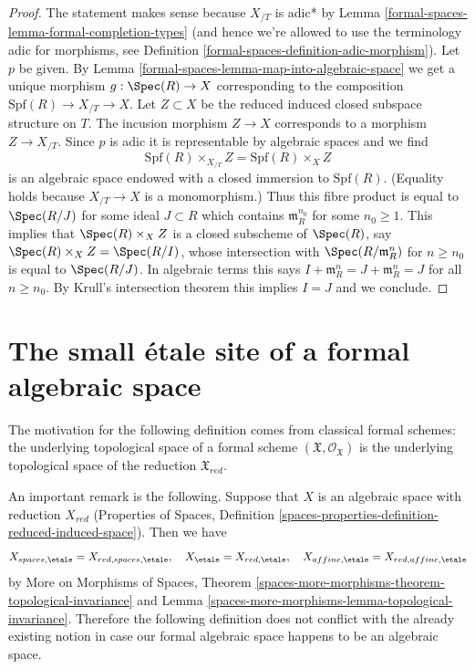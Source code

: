 \begin{proof}
The statement makes sense because $X_{/T}$ is adic* by
Lemma \ref{formal-spaces-lemma-formal-completion-types} (and hence we're
allowed to use the terminology adic for morphisms, see
Definition \ref{formal-spaces-definition-adic-morphism}).
Let $p$ be given. By Lemma \ref{formal-spaces-lemma-map-into-algebraic-space}
we get a unique morphism $g : \Spec(R) \to X$ corresponding to
the composition $\text{Spf}(R) \to X_{/T} \to X$.
Let $Z \subset X$ be the reduced induced closed subspace structure
on $T$. The incusion morphism $Z \to X$ corresponds to a morphism
$Z \to X_{/T}$. Since $p$ is adic it is representable by algebraic
spaces and we find
$$
\text{Spf}(R) \times_{X_{/T}} Z = \text{Spf}(R) \times_X Z
$$
is an algebraic space endowed with a closed immersion to $\text{Spf}(R)$.
(Equality holds because $X_{/T} \to X$ is a monomorphism.)
Thus this fibre product is equal to $\Spec(R/J)$ for some
ideal $J \subset R$ which contains $\mathfrak m_R^{n_0}$ for some
$n_0 \geq 1$. This implies that $\Spec(R) \times_X Z$
is a closed subscheme of $\Spec(R)$,
say $\Spec(R) \times_X Z = \Spec(R/I)$, whose intersection with
$\Spec(R/\mathfrak m_R^n)$ for $n \geq n_0$ is equal to $\Spec(R/J)$.
In algebraic terms this says
$I + \mathfrak m_R^n = J + \mathfrak m_R^n = J$ for all $n \geq n_0$.
By Krull's intersection theorem
this implies $I = J$ and we conclude.
\end{proof}

\section{The small \'etale site of a formal algebraic space}
\label{formal-spaces-section-etale-sites}
The motivation for the following definition comes from classical
formal schemes: the underlying topological space of a formal scheme
$(\mathfrak X, \mathcal{O}_\mathfrak X)$
is the underlying topological space of the reduction $\mathfrak X_{red}$.

\medskip\noindent
An important remark is the following. Suppose that $X$ is an algebraic space
with reduction $X_{red}$ (Properties of Spaces, Definition
\ref{spaces-properties-definition-reduced-induced-space}).
Then we have
$$
X_{spaces, \etale} = X_{red, spaces, \etale},\quad
X_\etale = X_{red, \etale},\quad
X_{affine, \etale} = X_{red, affine, \etale}
$$
by More on Morphisms of Spaces, Theorem
\ref{spaces-more-morphisms-theorem-topological-invariance} and
Lemma \ref{spaces-more-morphisms-lemma-topological-invariance}.
Therefore the following definition does not conflict with the already
existing notion in case our formal algebraic space happens to be
an algebraic space.

